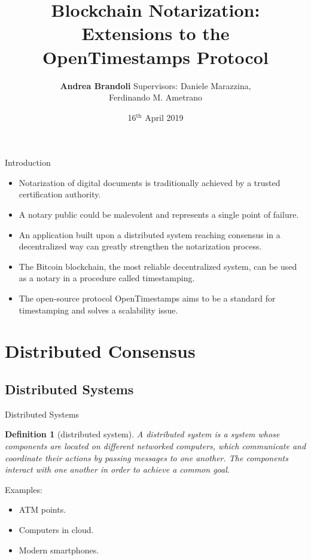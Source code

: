\documentclass[usenames,dvipsnames]{beamer}
\title{Blockchain Notarization: Extensions to the OpenTimestamps Protocol}
\author{\textbf{Andrea Brandoli} \qquad \qquad \qquad 
Supervisors: Daniele Marazzina,\\ \hspace*{6.78cm} Ferdinando M. Ametrano}
\date{16$^{\text{th}}$ April 2019}
\newtheorem{mydef}{\alert{Definition}}[section]
\begin{document}

    \begin{frame}
        \titlepage
    \end{frame}
    
    \begin{frame}{Introduction}
        \begin{itemize}
            \item \alert{Notarization} of digital documents is traditionally achieved by a trusted certification authority.
            \item A notary public could be malevolent and represents a \alert{single point of failure}.
            \item An application built upon a \alert{distributed system} reaching consensus in a \alert{decentralized way} can greatly strengthen the notarization process.
            \item The Bitcoin blockchain, the most reliable decentralized system, can be used as a notary in a procedure called \alert{timestamping}.
            \item The open-source protocol \alert{OpenTimestamps} aims to be a standard for timestamping and solves a scalability issue.
        \end{itemize}
    \end{frame}
    
    \section{Distributed Consensus}
    \subsection{Distributed Systems}
    \begin{frame}{Distributed Systems}
       \begin{mydef}[distributed system]
       A distributed system is a system whose components are located on different networked computers, which communicate and coordinate their actions by passing messages to one another. The components interact with one another in order to achieve a common goal.
       \end{mydef}
       \alert{Examples}:
       \begin{itemize}
           \item ATM points.
           \item Computers in cloud.
           \item Modern smartphones.
       \end{itemize}
    \end{frame}
        
\end{document}
